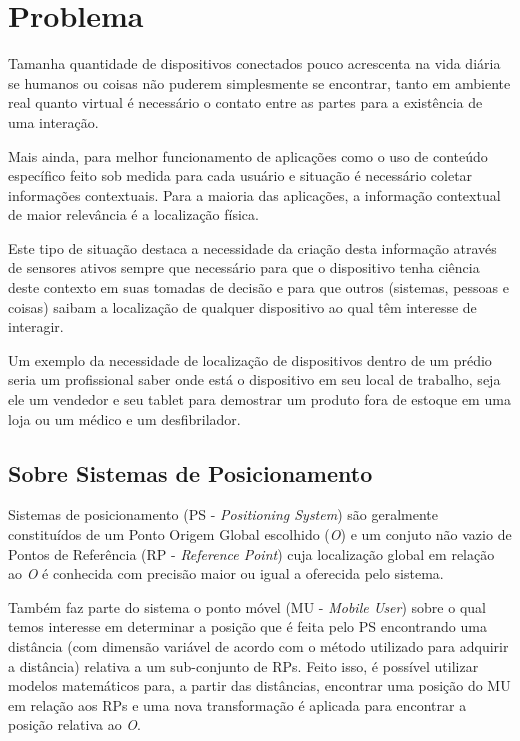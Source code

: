 \section{Problema}
\label{sec:Problema}

Tamanha quantidade de dispositivos conectados pouco acrescenta na vida diária se
humanos ou coisas não puderem simplesmente se encontrar, tanto em ambiente real
quanto virtual é necessário o contato entre as partes para a existência de uma
interação.

Mais ainda, para melhor funcionamento de aplicações como o uso de conteúdo
específico feito sob medida para cada usuário e situação é necessário coletar
informações contextuais. Para a maioria das aplicações, a informação contextual
de maior relevância é a localização física.

Este tipo de situação destaca a necessidade da criação desta informação através
de sensores ativos sempre que necessário para que o dispositivo tenha ciência
deste contexto em suas tomadas de decisão e para que outros (sistemas, pessoas e
coisas) saibam a localização de qualquer dispositivo ao qual têm interesse de
interagir.

Um exemplo da necessidade de localização de dispositivos dentro de um prédio
seria um profissional saber onde está o dispositivo em seu local de trabalho,
seja ele um vendedor e seu tablet para demostrar um produto fora de estoque em
uma loja ou um médico e um desfibrilador.

\subsection{Sobre Sistemas de Posicionamento}
\label{subsec:Sobre Sistemas de Posicionamento}

Sistemas de posicionamento (PS - \emph{Positioning System}) são geralmente
constituídos de um Ponto Origem Global escolhido (\emph{O}) e um conjuto não
vazio de Pontos de Referência (RP - \emph{Reference Point}) cuja localização
global em relação ao \emph{O} é conhecida com precisão maior ou igual a
oferecida pelo sistema.

Também faz parte do sistema o ponto móvel (MU - \emph{Mobile User}) sobre o
qual temos interesse em determinar a posição que é feita pelo PS encontrando uma
distância (com dimensão variável de acordo com o método utilizado para adquirir
a distância) relativa a um sub-conjunto de RPs. Feito isso, é possível utilizar
modelos matemáticos para, a partir das distâncias, encontrar uma posição do MU
em relação aos RPs e uma nova transformação é aplicada para encontrar a posição
relativa ao \emph{O}.

